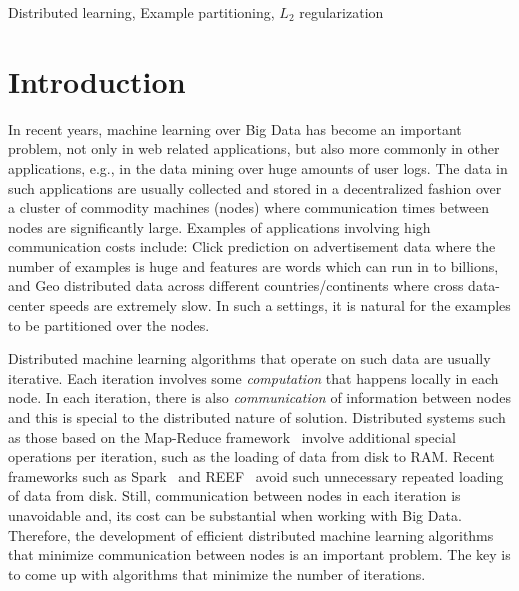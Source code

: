 \documentclass[twoside, 11pt]{article}
\begin{document}
\begin{keywords}
Distributed learning, Example partitioning, $L_2$ regularization
\end{keywords}


\def\grad{\nabla}
\def\wtilde{\tilde{w}}
\def\Cone{{\cal{C}}^1}
\def\kappap{\kappa^\prime}
\def\Lhat{\hat{L}}
\def\fhat{\hat{f}}
\def\what{\hat{w}}
\def\dhat{\hat{d}}
\def\mysgn{\operatorname{sgn}}
\def\ftilde{\tilde{f}}
\def\khat{\hat{k}}
\def\defs{\stackrel{\text{def}}{=}}
\def\vhat{\hat{v}}

\def\ttilde{\tilde{t}}
\def\that{\hat{t}}
\def\tstar{t^\star}
\newcommand{\yrcite}[1]{\citeyearpar{#1}}
\long{}

\def\K{{\bf ToDo:~}}

\newcommand{\Kee}[1]{\par\textcolor{violet}{\textbf{Keerthi:} #1}}


%

\section{Introduction}
\label{intro}

In recent years, machine learning over Big Data has become an important problem, not only in web related applications, but also more commonly in other applications, e.g., in the data mining over huge amounts of user logs. The data in such applications are usually collected and stored in a decentralized fashion over a cluster of commodity machines (nodes) where communication times between nodes are significantly large.  Examples of applications involving high communication costs include: Click prediction on advertisement data where the number of examples is huge and features are words which can run in to billions, and Geo distributed data across different countries/continents where cross data-center speeds are extremely slow.
In such a settings, it is natural for the examples to be partitioned over the nodes.

Distributed machine learning algorithms that operate on such data are usually iterative. Each iteration involves some {\em computation} that happens locally in each node. In each iteration, there is also {\em communication} of information between nodes and this is special to the distributed nature of solution. Distributed systems such as those based on the Map-Reduce framework~\citep{Dean2008} involve additional special operations per iteration, such as the loading of data from disk to RAM. Recent frameworks such as Spark~\citep{Zaharia2010} and REEF~\citep{weimer2015} avoid such unnecessary repeated loading of data from disk. Still, communication between nodes in each iteration is unavoidable and, its cost can be substantial when working with Big Data.
Therefore, the development of efficient distributed machine learning algorithms that minimize communication between nodes is an important problem. The key is to come up with algorithms that minimize the number of iterations.
\end{document}
